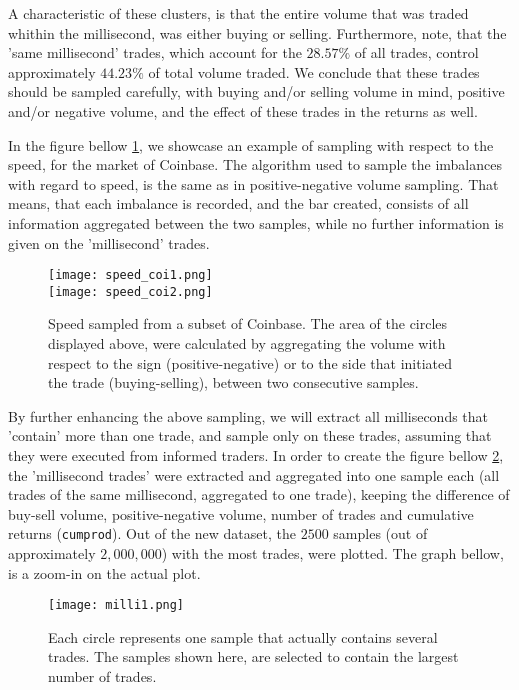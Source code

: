 A characteristic of these clusters, is that the entire volume that was traded whithin the millisecond, was either buying or selling. Furthermore, note, that the 'same millisecond' trades, which account for the \(28.57\%\) of all trades, control approximately \(44.23\%\) of total volume traded. We conclude that these trades should be sampled carefully, with buying and/or selling volume in mind, positive and/or negative volume, and the effect of these trades in the returns as well.

In the figure bellow \ref{fig:speed_coi}, we showcase an example of sampling with respect to the speed, for the market of Coinbase. The algorithm used to sample the imbalances with regard to speed, is the same as in positive-negative volume sampling. That means, that each imbalance is recorded, and the bar created, consists of all information aggregated between the two samples, while no further information is given on the 'millisecond' trades.

\begin{figure}[H]
	\centering
    \texttt{[image: speed\_coi1.png]} \\
    \texttt{[image: speed\_coi2.png]}
	\caption{Speed sampled from a subset of Coinbase. The area of the circles displayed above, were calculated by aggregating the volume with respect to the sign (positive-negative) or to the side that initiated the trade (buying-selling), between two consecutive samples.}
    \label{fig:speed_coi}
\end{figure}

By further enhancing the above sampling, we will extract all milliseconds that 'contain' more than one trade, and sample only on these trades, assuming that they were executed from informed traders. In order to create the figure bellow \ref{fig:milli1}, the 'millisecond trades' were extracted and aggregated into one sample each (all trades of the same millisecond, aggregated to one trade), keeping the difference of buy-sell volume, positive-negative volume, number of trades and cumulative returns (\texttt{cumprod}). Out of the new dataset, the \(2500\) samples (out of approximately \(2,000,000\)) with the most trades, were plotted. The graph bellow, is a zoom-in on the actual plot.

\begin{figure}[H]
	\centering
    \texttt{[image: milli1.png]}
	\caption{Each circle represents one sample that actually contains several trades. The samples shown here, are selected to contain the largest number of trades.}
    \label{fig:milli1}
\end{figure}




